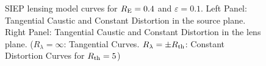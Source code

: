 \begin{figure}[!ht]
\caption{\label{siep_curves_pm-1} SIEP lensing model curves for $R_{\rm E}=0.4$
and $\varepsilon=0.1$. Left Panel: Tangential Caustic and Constant Distortion in
the source plane. Right Panel: Tangential Caustic and Constant Distortion in the
lens plane. ($R_\lambda=\infty$: Tangential Curves. $R_\lambda=\pm R_{\rm th}$:
Constant Distortion Curves for $R_{\rm th}=5$)}
\end{figure}


